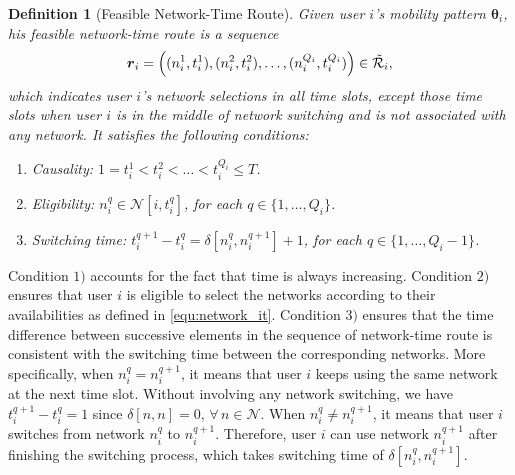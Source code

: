 \documentclass[journal]{IEEEtran}
\newcommand{\fa}[2]{\, \forall \, #1 \in \mathcal{#2}}
\newtheorem{definition}{Definition}
\begin{document}
\begin{definition}[Feasible Network-Time Route]  \label{def:networktimeroute}
  Given user $i$'s mobility pattern $\boldsymbol{\theta}_i$, his \emph{feasible network-time route} is a sequence
%
\begin{equation} \label{equ:action}
  \boldsymbol{r}_i = \Bigl((n_i^{1},t_i^{1}),(n_i^2,t_i^2),\ldots,(n_i^{Q_i},t_i^{Q_i})\Bigr) \in \tilde{\mathcal{R}}_i,
\end{equation}
%
which indicates user $i$'s network selections in all time slots, except those time slots when user $i$ is in the middle of network switching and is not associated with any network.
It satisfies the following conditions: %
 \begin{enumerate}
  \item Causality: $1=t_i^{1}<t_i^{2}<\ldots<t_i^{Q_i} \leq T$.
	
  \item Eligibility: $n_i^{q} \in \mathcal{N}[i,t_i^q]$, for each $q \in \{ 1, \ldots, Q_i \}$.
	
  \item Switching time: $t_i^{q+1} - t_i^q = \delta[n_i^q, n_i^{q+1}] + 1$, for each $q \in \{ 1, \ldots, Q_i-1 \}$.
 \end{enumerate}
\end{definition}



	
  Condition $1)$ accounts for the fact that time is always increasing. 
	Condition $2)$ ensures that user $i$ is eligible to select the networks according to their availabilities as defined in \eqref{equ:network_it}.
	Condition $3)$ ensures that the time difference between successive elements in the sequence of network-time route is consistent with the switching time between the corresponding networks. 
	More specifically, when $n_i^q = n_i^{q+1}$, it means that user $i$ keeps using the same network at the next time slot. Without involving any network switching, we have $t_i^{q+1}-t_i^q = 1$ since $\delta[n,n] = 0, \fa{n}{N}$. 
	When $n_i^q \neq n_i^{q+1}$, it means that user $i$ switches from network $n_i^q$ to $n_i^{q+1}$. Therefore, user $i$ can use network $n_i^{q+1}$ after finishing the switching process, which takes switching time of $\delta[n_i^q,n_i^{q+1}]$.  
\end{document}

